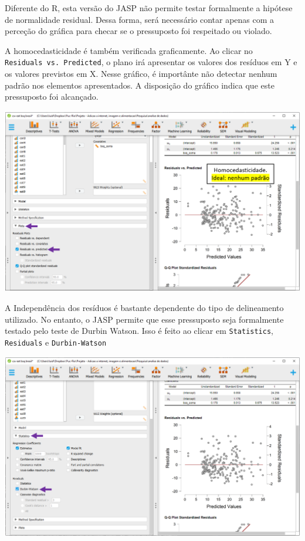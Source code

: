 \documentclass[
]{book}
\begin{document}
Diferente do R, esta versão do JASP não permite testar formalmente a hipótese de normalidade residual. Dessa forma, será necessário contar apenas com a perceção do gráfica para checar se o pressuposto foi respeitado ou violado.

A homocedasticidade é também verificada graficamente. Ao clicar no \texttt{Residuals\ vs.\ Predicted}, o plano irá apresentar os valores dos resíduos em Y e os valores previstos em X. Nesse gráfico, é importânte não detectar nenhum padrão nos elementos apresentados. A disposição do gráfico indica que este pressuposto foi alcançado.

\includegraphics{./img/cap_reg_homocedasticidade_jasp.png}

A Independência dos resíduos é bastante dependente do tipo de delineamento utilizado. No entanto, o JASP permite que esse pressuposto seja formalmente testado pelo teste de Durbin Watson. Isso é feito ao clicar em \texttt{Statistics}, \texttt{Residuals} e \texttt{Durbin-Watson}

\includegraphics{./img/cap_reg_independencia_jasp.png}
\end{document}
